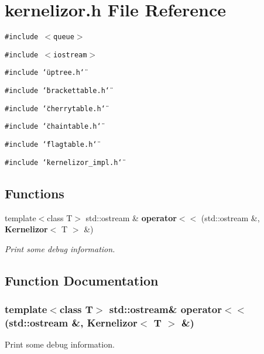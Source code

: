 \section{kernelizor.h File Reference}
\label{kernelizor_8h}
{\tt \#include $<$queue$>$}\par
{\tt \#include $<$iostream$>$}\par
{\tt \#include \char`\"{}uptree.h\char`\"{}}\par
{\tt \#include \char`\"{}brackettable.h\char`\"{}}\par
{\tt \#include \char`\"{}cherrytable.h\char`\"{}}\par
{\tt \#include \char`\"{}chaintable.h\char`\"{}}\par
{\tt \#include \char`\"{}flagtable.h\char`\"{}}\par
{\tt \#include \char`\"{}kernelizor\_\-impl.h\char`\"{}}\par
\subsection*{Functions}
\begin{CompactItemize}
\item 
template$<$class T$>$ std::ostream \& {\bf operator$<$$<$} (std::ostream \&, {\bf Kernelizor}$<$ T $>$ \&)
\begin{CompactList}\small\item\em Print some debug information. \item\end{CompactList}\end{CompactItemize}


\subsection{Function Documentation}
\subsubsection{\setlength{\rightskip}{0pt plus 5cm}template$<$class T$>$ std::ostream\& operator$<$$<$ (std::ostream \&, {\bf Kernelizor}$<$ T $>$ \&)}\label{kernelizor_8h_a0}


Print some debug information. 

